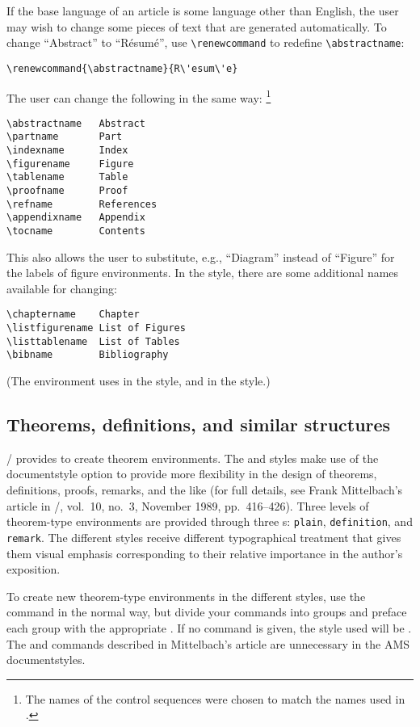 If the base language of an article is some language other than
English, the user may wish to change some pieces of text that
are generated automatically.  To change ``Abstract'' to ``R\'esum\'e'',
use \verb=\renewcommand= to redefine \verb=\abstractname=:
\begin{verbatim}
\renewcommand{\abstractname}{R\'esum\'e}
\end{verbatim}
The user can change the following in the same way:%
\footnote{The names of the control sequences
were chosen to match the names used in .}
\begin{verbatim}
\abstractname   Abstract
\partname       Part
\indexname      Index
\figurename     Figure
\tablename      Table
\proofname      Proof
\refname        References
\appendixname   Appendix
\tocname        Contents
\end{verbatim}
This also allows the user to substitute,
e.g., ``Diagram'' instead of ``Figure'' for the labels of
figure environments.
In the  style, there are some additional
names available for changing:
\begin{verbatim}
\chaptername    Chapter
\listfigurename List of Figures
\listtablename  List of Tables
\bibname        Bibliography
\end{verbatim}
(The environment  uses  in the
 style, and  in the
 style.)

\subsection{Theorems, definitions, and similar structures}

\latex/ provides  to create theorem
environments.  The  and  styles make
use of the  documentstyle option to provide more
flexibility in the design of theorems, definitions, proofs,
remarks, and the like (for full details, see Frank
Mittelbach's article in \tugboat/, vol.~10, no.~3,
November 1989, pp.~416--426).  Three levels of
theorem-type environments are provided through
three s: {\tt plain}, {\tt definition},
and {\tt remark}.  The different styles receive different
typographical treatment that gives them visual emphasis
corresponding to their relative importance in the
author's exposition.

To create new theorem-type environments in the
different styles, use the\linebreak[1]  command
in the normal way, but divide your  commands
into groups and preface each group with the appropriate
.
If no  command is given, the style used will
be .  The\linebreak[1]  and
 commands described in Mittelbach's article
are unnecessary in the AMS documentstyles.

